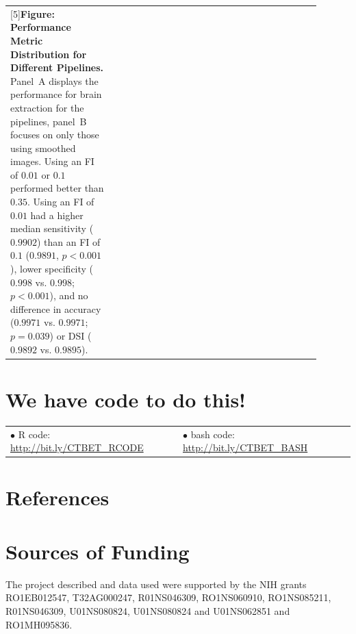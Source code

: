 \documentclass[final]{beamer}\usepackage[]{graphicx}\usepackage[]{color}
\begin{document}
\begin{frame}[fragile]
\begin{multicols}{2}
\begin{tabular}{>{\centering}m{0.3\linewidth}>{\centering}m{0.3\linewidth}p{0.3\linewidth}}
\multirow{1}{\linewidth}[5\baselineskip]{{\bf Figure: Performance Metric Distribution for Different Pipelines.} Panel~A displays the performance for brain extraction for the pipelines, panel~B focuses on only those using smoothed images. 
Using an FI of $0.01$ or $0.1$ performed better than $0.35$.  Using an FI of $0.01$ had a higher median sensitivity ($0.9902$) than an FI of $0.1$ ($0.9891$, $p< 0.001$), lower specificity ($0.998$ vs. $0.998$; $p< 0.001$), and no difference in accuracy ($0.9971$ vs. $0.9971$; $p= 0.039$) or DSI ($0.9892$ vs. $0.9895$). }
\end{tabular}


\section{We have code to do this!}

\begin{tabular}{m{0.5\linewidth} m{0.5\linewidth} }
$\bullet$ R code: \url{http://bit.ly/CTBET_RCODE} & $\bullet$ bash code: \url{http://bit.ly/CTBET_BASH}
\end{tabular}

\section{References}
\setlength\bibitemsep{0pt}
\printbibliography[heading=none]\vspace*{-0.5cm}

\section{Sources of Funding}
The project described and data used were supported by the NIH grants RO1EB012547, T32AG000247, R01NS046309, RO1NS060910, RO1NS085211, R01NS046309, U01NS080824, U01NS080824 and U01NS062851 and RO1MH095836.


\vfill
\columnbreak

%


\end{multicols}
\end{frame}
\end{document}
